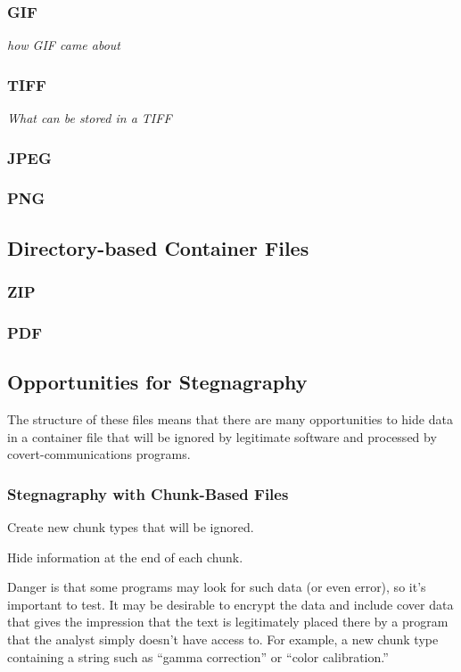 \documentclass[11pt,letter]{article}
\begin{document}
\subsubsection{GIF}
\emph{how GIF came about}

\subsubsection{TIFF}
\emph{What can be stored in a TIFF}

\subsubsection{JPEG}\label{jpeg-format}
\subsubsection{PNG}

\subsection{Directory-based Container Files}

\subsubsection{ZIP}

\subsubsection{PDF}

\subsection{Opportunities for Stegnagraphy}
The structure of these files means that there are many opportunities
to hide data in a container file that will be ignored by legitimate
software and processed by covert-communications programs.

\subsubsection{Stegnagraphy with Chunk-Based Files}
Create new chunk types that will be ignored.

Hide information at the end of each chunk.

Danger is that some programs may look for such data (or even error),
so it's important to test. It may be desirable to encrypt the data and
include cover data that gives the impression that the text is
legitimately placed there by a program that the analyst simply doesn't
have access to. For example, a new chunk type containing a string such
as ``gamma correction'' or ``color calibration.''
\end{document}
